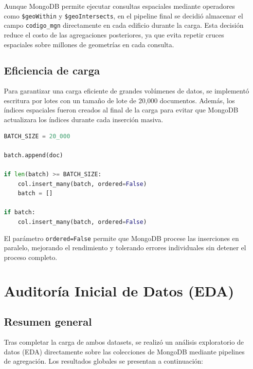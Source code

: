 \documentclass{article}
\begin{document}
Aunque MongoDB permite ejecutar consultas espaciales mediante operadores como \texttt{\$geoWithin} y \texttt{\$geoIntersects}, en el pipeline final se decidió almacenar el campo \texttt{codigo\_mgn} directamente en cada edificio durante la carga. Esta decisión reduce el costo de las agregaciones posteriores, ya que evita repetir cruces espaciales sobre millones de geometrías en cada consulta.

\subsection{Eficiencia de carga}

Para garantizar una carga eficiente de grandes volúmenes de datos, se implementó escritura por lotes con un tamaño de lote de 20,000 documentos. Además, los índices espaciales fueron creados al final de la carga para evitar que MongoDB actualizara los índices durante cada inserción masiva.

\begin{lstlisting}[language=Python, caption={Inserción por lotes optimizada}]
BATCH_SIZE = 20_000

batch.append(doc)

if len(batch) >= BATCH_SIZE:
    col.insert_many(batch, ordered=False)
    batch = []

if batch:
    col.insert_many(batch, ordered=False)
\end{lstlisting}

El parámetro \texttt{ordered=False} permite que MongoDB procese las inserciones en paralelo, mejorando el rendimiento y tolerando errores individuales sin detener el proceso completo.

\section{Auditoría Inicial de Datos (EDA)}

\subsection{Resumen general}

Tras completar la carga de ambos datasets, se realizó un análisis exploratorio de datos (EDA) directamente sobre las colecciones de MongoDB mediante pipelines de agregación. Los resultados globales se presentan a continuación:
\end{document}
